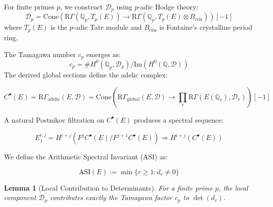 \documentclass{article}
\theoremstyle{plain}
\newtheorem{lemma}[theorem]{Lemma}
\theoremstyle{definition}
\theoremstyle{remark}
\begin{document}
For finite primes $p$, we construct $\mathcal{D}_p$ using $p$-adic Hodge theory:
\begin{equation}
\mathcal{D}_p = \text{Cone}(\text{R}\Gamma(\mathbb{Q}_p, T_p(E)) \rightarrow \text{R}\Gamma(\mathbb{Q}_p, T_p(E) \otimes B_{\text{cris}}))[-1]
\end{equation}
where $T_p(E)$ is the $p$-adic Tate module and $B_{\text{cris}}$ is Fontaine's crystalline period ring.
\vspace{.3cm} 

The Tamagawa number $c_p$ emerges as:
\begin{equation}
c_p = \#H^0(\mathbb{Q}_p, \mathcal{D}_p)/\text{Im}(H^0(\mathbb{Q}, \mathcal{D}))
\end{equation}
\clearpage
The derived global sections define the adelic complex:

\begin{equation}
C^{\bullet}(E) = \text{R}\Gamma_{\text{adelic}}(E, \mathcal{D}) = \text{Cone}\left(\text{R}\Gamma_{\text{global}}(E, \mathcal{D}) \rightarrow \prod_v \text{R}\Gamma(E(\mathbb{Q}_v), \mathcal{D}_v)\right)[-1]
\end{equation}

A natural Postnikov filtration on $C^{\bullet}(E)$ produces a spectral sequence:

\begin{equation}
E_1^{i,j} = H^{i+j}(F^j C^{\bullet}(E)/F^{j+1}C^{\bullet}(E)) \Rightarrow H^{i+j}(C^{\bullet}(E))
\end{equation}

We define the Arithmetic Spectral Invariant (ASI) as:

\begin{equation}
\text{ASI}(E) := \min\{r \geq 1 : d_r \neq 0\}
\end{equation}

\begin{lemma}[Local Contribution to Determinants]
For a finite prime $p$, the local component $\mathcal{D}_p$ contributes exactly the Tamagawa factor $c_p$ to $\det(d_r)$.
\end{lemma}
\end{document}
